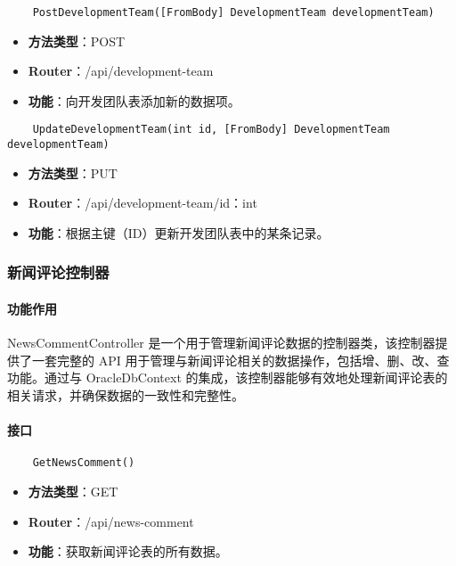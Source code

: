 \begin{verbatim}
	PostDevelopmentTeam([FromBody] DevelopmentTeam developmentTeam)
\end{verbatim}

\begin{itemize}
	\item \textbf{方法类型}：POST
	\item \textbf{Router}：/api/development-team
	\item \textbf{功能}：向开发团队表添加新的数据项。
\end{itemize}

\begin{verbatim}
	UpdateDevelopmentTeam(int id, [FromBody] DevelopmentTeam developmentTeam)
\end{verbatim}

\begin{itemize}
	\item \textbf{方法类型}：PUT
	\item \textbf{Router}：/api/development-team/{id：int}
	\item \textbf{功能}：根据主键（ID）更新开发团队表中的某条记录。
\end{itemize}

\subsubsection{新闻评论控制器}

\paragraph{功能作用}

NewsCommentController 是一个用于管理新闻评论数据的控制器类，该控制器提供了一套完整的 API 用于管理与新闻评论相关的数据操作，包括增、删、改、查功能。通过与 OracleDbContext 的集成，该控制器能够有效地处理新闻评论表的相关请求，并确保数据的一致性和完整性。

\paragraph{接口}

\begin{verbatim}
	GetNewsComment()
\end{verbatim}

\begin{itemize}
	\item \textbf{方法类型}：GET
	\item \textbf{Router}：/api/news-comment
	\item \textbf{功能}：获取新闻评论表的所有数据。
\end{itemize}

